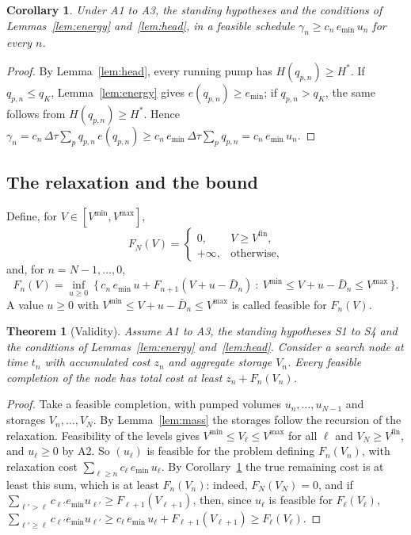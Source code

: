\documentclass[11pt]{article}
\newtheorem{theorem}{Theorem}
\newtheorem{corollary}{Corollary}
\theoremstyle{remark}
\newcommand{\dtau}{\Delta\tau}
\newcommand{\emin}{e_{\min}}
\newcommand{\Vmin}{V^{\min}}
\newcommand{\Vmax}{V^{\max}}
\newcommand{\Vfin}{V^{\mathrm{fin}}}
\begin{document}
\begin{corollary}\label{cor:cost}
Under A1 to A3, the standing hypotheses and the conditions of Lemmas~\ref{lem:energy}
and~\ref{lem:head}, in a feasible schedule
$\gamma_n \ge c_n\, \emin\, u_n$ for every $n$.
\end{corollary}

\begin{proof}
By Lemma~\ref{lem:head}, every running pump has $H(q_{p,n}) \ge H^*$. If
$q_{p,n} \le q_K$, Lemma~\ref{lem:energy} gives $e(q_{p,n}) \ge \emin$; if
$q_{p,n} > q_K$, the same follows from $H(q_{p,n}) \ge H^*$. Hence
$\gamma_n = c_n\, \dtau \sum_p q_{p,n}\, e(q_{p,n}) \ge c_n\, \emin\, \dtau \sum_p q_{p,n}
= c_n\, \emin\, u_n$.
\end{proof}

\subsection{The relaxation and the bound}\label{sec:bound}

Define, for $V \in [\Vmin, \Vmax]$,
\[
  F_N(V) =
  \begin{cases}
    0, & V \ge \Vfin,\\
    +\infty, & \text{otherwise},
  \end{cases}
\]
and, for $n = N-1, \dots, 0$,
\[
  F_n(V) = \inf_{u \ge 0}\ \bigl\{\, c_n\, \emin\, u + F_{n+1}(V + u - \bar D_n)\ :\
  \Vmin \le V + u - \bar D_n \le \Vmax \,\bigr\}.
\]
A value $u \ge 0$ with $\Vmin \le V + u - \bar D_n \le \Vmax$ is called feasible for
$F_n(V)$.

\begin{theorem}[Validity]\label{thm:validity}
Assume A1 to A3, the standing hypotheses S1 to S4 and the conditions of
Lemmas~\ref{lem:energy} and~\ref{lem:head}. Consider a search node at time $t_n$ with
accumulated cost $z_n$ and aggregate storage $V_n$. Every feasible completion of the node
has total cost at least $z_n + F_n(V_n)$.
\end{theorem}

\begin{proof}
Take a feasible completion, with pumped volumes $u_n, \dots, u_{N-1}$ and storages
$V_n, \dots, V_N$. By Lemma~\ref{lem:mass} the storages follow the recursion of the
relaxation. Feasibility of the levels gives $\Vmin \le V_\ell \le \Vmax$ for all $\ell$
and $V_N \ge \Vfin$, and $u_\ell \ge 0$ by A2. So $(u_\ell)$ is feasible for the problem
defining $F_n(V_n)$, with relaxation cost $\sum_{\ell \ge n} c_\ell\, \emin\, u_\ell$. By
Corollary~\ref{cor:cost} the true remaining cost is at least this sum, which is at least
$F_n(V_n)$: indeed, $F_N(V_N) = 0$, and if
$\sum_{\ell' > \ell} c_{\ell'} \emin u_{\ell'} \ge F_{\ell+1}(V_{\ell+1})$, then, since
$u_\ell$ is feasible for $F_\ell(V_\ell)$,
$\sum_{\ell' \ge \ell} c_{\ell'} \emin u_{\ell'} \ge c_\ell\, \emin\, u_\ell +
F_{\ell+1}(V_{\ell+1}) \ge F_\ell(V_\ell)$.
\end{proof}
\end{document}
